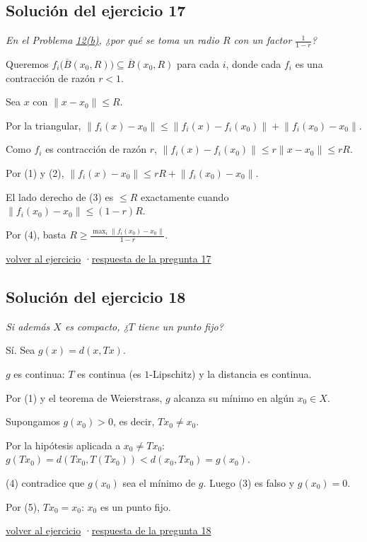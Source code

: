 \documentclass[11pt,a4paper]{article}
\newcommand{\cl}[1]{\overline{#1}}\newcommand{\norm}[1]{\lVert #1\rVert}\newcommand{\abs}[1]{\lvert #1\rvert}
\providecommand{\lt}{<}\providecommand{\gt}{>}
\begin{document}
\subsection*{\hypertarget{s-17}{}Solución del ejercicio 17}
\emph{En el Problema \hyperlink{prob-12}{12(b)}, ¿por qué se toma un radio $R$ con un factor $\frac1{1-r}$?}
\begin{pasos}
\item[] Queremos $f_i\bigl(\cl B(x_0,R)\bigr)\subseteq\cl B(x_0,R)$ para cada $i$, donde cada $f_i$ es una contracción de razón $r\lt 1$.
\item[] Sea $x$ con $\norm{x-x_0}\le R$.
\item[(1)] Por la triangular, $\norm{f_i(x)-x_0}\le\norm{f_i(x)-f_i(x_0)}+\norm{f_i(x_0)-x_0}$.
\item[(2)] Como $f_i$ es contracción de razón $r$, $\norm{f_i(x)-f_i(x_0)}\le r\norm{x-x_0}\le rR$.
\item[(3)] Por (1) y (2), $\norm{f_i(x)-x_0}\le rR+\norm{f_i(x_0)-x_0}$.
\item[(4)] El lado derecho de (3) es $\le R$ exactamente cuando $\norm{f_i(x_0)-x_0}\le(1-r)R$.
\item[] Por (4), basta $R\ge\frac{\max_i\norm{f_i(x_0)-x_0}}{1-r}$.
\end{pasos}
\par{\small \hyperlink{x-17}{volver al ejercicio} \quad·\quad \hyperlink{r-17}{respuesta de la pregunta 17}}
\subsection*{\hypertarget{s-18}{}Solución del ejercicio 18}
\emph{Si además $X$ es compacto, ¿$T$ tiene un punto fijo?}
\begin{pasos}
\item[] Sí. Sea $g(x)=d(x,Tx)$.
\item[(1)] $g$ es continua: $T$ es continua (es $1$-Lipschitz) y la distancia es continua.
\item[(2)] Por (1) y el teorema de Weierstrass, $g$ alcanza su mínimo en algún $x_0\in X$.
\item[(3)] Supongamos $g(x_0)\gt 0$, es decir, $Tx_0\ne x_0$.
\item[(4)] Por la hipótesis aplicada a $x_0\ne Tx_0$: $g(Tx_0)=d(Tx_0,T(Tx_0))\lt d(x_0,Tx_0)=g(x_0)$.
\item[(5)] (4) contradice que $g(x_0)$ sea el mínimo de $g$. Luego (3) es falso y $g(x_0)=0$.
\item[] Por (5), $Tx_0=x_0$: $x_0$ es un punto fijo.
\end{pasos}
\par{\small \hyperlink{x-18}{volver al ejercicio} \quad·\quad \hyperlink{r-18}{respuesta de la pregunta 18}}
\end{document}
